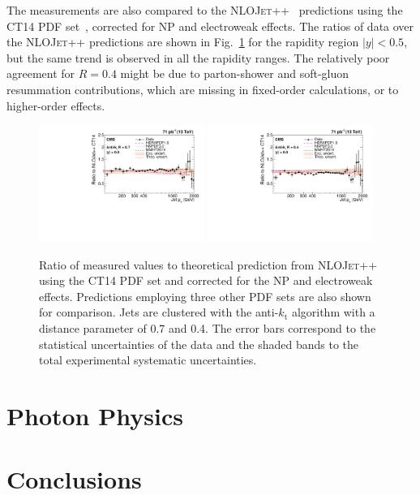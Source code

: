 \documentclass{PoS}
\providecommand{\NLOJETPP} {{\textsc{NLOJet++}}\xspace} \providecommand{\kts}{\ensuremath{k_{\mathrm{t}}}\xspace}
\begin{document}
The measurements are also compared to the \NLOJETPP~\cite{Nagy:2003tz} predictions using the CT14 PDF set~\cite{Dulat:2015mca}, corrected for NP and electroweak effects.
The ratios of data over the \NLOJETPP predictions are shown in Fig.~\ref{fig:ratio_CT14} for the rapidity region
$|y|<0.5$, but the same trend is observed in all the rapidity ranges. The relatively poor agreement for $R = 0.4$ might
be due to parton-shower and soft-gluon resummation contributions, which are missing in fixed-order calculations, or to
higher-order effects. 

\begin{figure}[htbp]
  \includegraphics[width=0.48\textwidth]{Figure2-a.pdf}
  \includegraphics[width=0.48\textwidth]{Figure2-b.pdf}
  \caption{Ratio of measured values to theoretical prediction from \NLOJETPP using the CT14 PDF set and corrected for
the NP and electroweak effects. Predictions employing three other PDF sets are also shown for comparison. Jets are
clustered with the anti-\kts algorithm with a distance parameter of 0.7 and 0.4. The error bars correspond to the statistical
uncertainties of the data and the shaded bands to the total experimental systematic uncertainties.}
  \label{fig:ratio_CT14}
\end{figure}

\section{Photon Physics}

\section{Conclusions}
\end{document}
